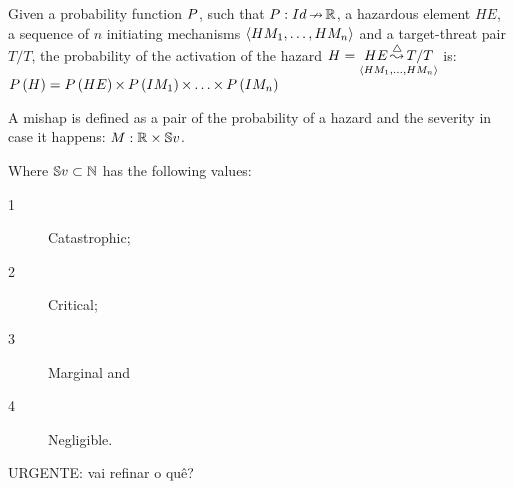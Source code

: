 \begin{definition}
Given a probability function $\hmprobabilitysymbol$, such that $P: \hmpartialfunction {Id}{\hmdatatypereal}$, a hazardous element $HE$, a sequence of $n$ initiating mechanisms $\hmseqenum{HM_1,\ldots,HM_n}$ and a target-threat pair $T/T$, the probability of the activation of the hazard $H = \hmhazard{HE}{\hmseqenum{HM_1,\ldots,HM_n}}{T/T}$ is:
%
\\$\hmprobability{H} = \hmtimes{\hmprobability{HE}}{\hmtimes{\hmtimes{\hmprobability{IM_1}}{\ldots}}{\hmprobability{IM_n}}}$
\end{definition}

\begin{definition}[Mishap]
A mishap is defined as a pair of the probability of a hazard and the severity in case it happens: $M: \hmcartesian{\hmdatatypereal}{\hmdatatypeseverity}$.
\end{definition}
%
\noindent Where $\hmdatatypeseverity \subset \hmdatatypenatural$ has the following values:
\begin{description}
  \item[1] Catastrophic;
  \item[2] Critical;
  \item[3] Marginal and
  \item[4] Negligible.
\end{description}

{\huge
URGENTE: vai refinar o quê?
}